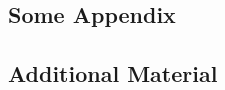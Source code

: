 \begin{appendices}

    \chapter{Some Appendix}
    \label{appendix}

    \section{Additional Material}

\end{appendices}
